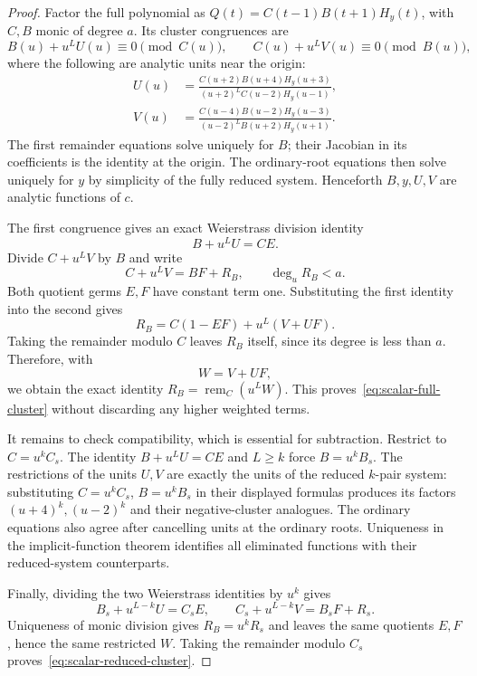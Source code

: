 \documentclass[11pt]{article}
\theoremstyle{definition}
\begin{document}
\begin{proof}
Factor the full polynomial as $Q(t)=C(t-1)B(t+1)H_y(t)$, with $C,B$
monic of degree $a$. Its cluster congruences are
\[
 B(u)+u^LU(u)\equiv0\pmod{C(u)},\qquad
 C(u)+u^LV(u)\equiv0\pmod{B(u)},
\]
where the following are analytic units near the origin:
\[
 \begin{aligned}
 U(u)&=\frac{C(u+2)B(u+4)H_y(u+3)}
              {(u+2)^LC(u-2)H_y(u-1)},\\
 V(u)&=\frac{C(u-4)B(u-2)H_y(u-3)}
              {(u-2)^LB(u+2)H_y(u+1)}.
 \end{aligned}
\]
The first remainder equations solve uniquely for $B$; their Jacobian
in its coefficients is the identity at the origin. The ordinary-root
equations then solve uniquely for $y$ by simplicity of the fully
reduced system. Henceforth $B,y,U,V$ are analytic functions of $c$.

The first congruence gives an exact Weierstrass division identity
\[
 B+u^LU=CE.
\]
Divide $C+u^LV$ by $B$ and write
\[
 C+u^LV=BF+R_B,\qquad \deg_uR_B<a.
\]
Both quotient germs $E,F$ have constant term one. Substituting the
first identity into the second gives
\[
 R_B=C(1-EF)+u^L(V+UF).
\]
Taking the remainder modulo $C$ leaves $R_B$ itself, since its degree
is less than $a$. Therefore, with
\begin{equation}\label{eq:effective-cluster-W}
 W=V+UF,
\end{equation}
we obtain the exact identity $R_B=\operatorname{rem}_C(u^LW)$.
This proves~\eqref{eq:scalar-full-cluster} without discarding any
higher weighted terms.

It remains to check compatibility, which is essential for subtraction.
Restrict to $C=u^kC_s$. The identity $B+u^LU=CE$ and $L\ge k$ force
$B=u^kB_s$. The restrictions of the units $U,V$ are exactly the units
of the reduced $k$-pair system: substituting $C=u^kC_s$, $B=u^kB_s$
in their displayed formulas produces its factors $(u+4)^k,(u-2)^k$
and their negative-cluster analogues. The ordinary equations also
agree after cancelling units at the ordinary roots. Uniqueness in
the implicit-function theorem identifies all eliminated functions
with their reduced-system counterparts.

Finally, dividing the two Weierstrass identities by $u^k$ gives
\[
 B_s+u^{L-k}U=C_sE,\qquad
 C_s+u^{L-k}V=B_sF+R_s.
\]
Uniqueness of monic division gives $R_B=u^kR_s$ and leaves the same
quotients $E,F$, hence the same restricted $W$. Taking the remainder
modulo $C_s$ proves~\eqref{eq:scalar-reduced-cluster}.
\end{proof}
\end{document}
